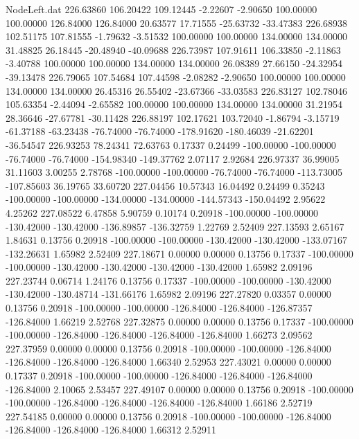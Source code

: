 \begin{filecontents}{NodeLeft.dat}
 226.63860  106.20422  109.12445    -2.22607   -2.90650  100.00000  100.00000  126.84000  126.84000   20.63577   17.71555  -25.63732  -33.47383
 226.68938  102.51175  107.81555    -1.79632   -3.51532  100.00000  100.00000  134.00000  134.00000   31.48825   26.18445  -20.48940  -40.09688
 226.73987  107.91611  106.33850    -2.11863   -3.40788  100.00000  100.00000  134.00000  134.00000   26.08389   27.66150  -24.32954  -39.13478
 226.79065  107.54684  107.44598    -2.08282   -2.90650  100.00000  100.00000  134.00000  134.00000   26.45316   26.55402  -23.67366  -33.03583
 226.83127  102.78046  105.63354    -2.44094   -2.65582  100.00000  100.00000  134.00000  134.00000   31.21954   28.36646  -27.67781  -30.11428
 226.88197  102.17621  103.72040    -1.86794   -3.15719  -61.37188  -63.23438  -76.74000  -76.74000 -178.91620 -180.46039  -21.62201  -36.54547
 226.93253   78.24341   72.63763     0.17337    0.24499 -100.00000 -100.00000  -76.74000  -76.74000 -154.98340 -149.37762    2.07117    2.92684
 226.97337   36.99005   31.11603     3.00255    2.78768 -100.00000 -100.00000  -76.74000  -76.74000 -113.73005 -107.85603   36.19765   33.60720
 227.04456   10.57343   16.04492     0.24499    0.35243 -100.00000 -100.00000 -134.00000 -134.00000 -144.57343 -150.04492    2.95622    4.25262
 227.08522    6.47858    5.90759     0.10174    0.20918 -100.00000 -100.00000 -130.42000 -130.42000 -136.89857 -136.32759    1.22769    2.52409
 227.13593    2.65167    1.84631     0.13756    0.20918 -100.00000 -100.00000 -130.42000 -130.42000 -133.07167 -132.26631    1.65982    2.52409
 227.18671    0.00000    0.00000     0.13756    0.17337 -100.00000 -100.00000 -130.42000 -130.42000 -130.42000 -130.42000    1.65982    2.09196
 227.23744    0.06714    1.24176     0.13756    0.17337 -100.00000 -100.00000 -130.42000 -130.42000 -130.48714 -131.66176    1.65982    2.09196
 227.27820    0.03357    0.00000     0.13756    0.20918 -100.00000 -100.00000 -126.84000 -126.84000 -126.87357 -126.84000    1.66219    2.52768
 227.32875    0.00000    0.00000     0.13756    0.17337 -100.00000 -100.00000 -126.84000 -126.84000 -126.84000 -126.84000    1.66273    2.09562
 227.37959    0.00000    0.00000     0.13756    0.20918 -100.00000 -100.00000 -126.84000 -126.84000 -126.84000 -126.84000    1.66340    2.52953
 227.43021    0.00000    0.00000     0.17337    0.20918 -100.00000 -100.00000 -126.84000 -126.84000 -126.84000 -126.84000    2.10065    2.53457
 227.49107    0.00000    0.00000     0.13756    0.20918 -100.00000 -100.00000 -126.84000 -126.84000 -126.84000 -126.84000    1.66186    2.52719
 227.54185    0.00000    0.00000     0.13756    0.20918 -100.00000 -100.00000 -126.84000 -126.84000 -126.84000 -126.84000    1.66312    2.52911

\end{filecontents}
